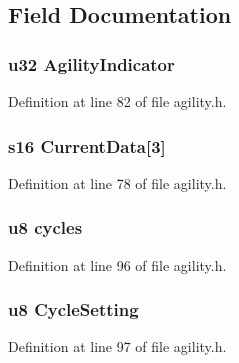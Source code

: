 \subsection{\-Field \-Documentation}
\hypertarget{structagil_aca4918ae56fe21d73cc4b85d5ce1d3af}{
\subsubsection[{\-Agility\-Indicator}]{\setlength{\rightskip}{0pt plus 5cm}u32 {\bf \-Agility\-Indicator}}}\label{structagil_aca4918ae56fe21d73cc4b85d5ce1d3af}


\-Definition at line 82 of file agility.\-h.

\hypertarget{structagil_ac11c5137c1e21f67a03b39f8d0325bc1}{
\subsubsection[{\-Current\-Data}]{\setlength{\rightskip}{0pt plus 5cm}s16 {\bf \-Current\-Data}\mbox{[}3\mbox{]}}}\label{structagil_ac11c5137c1e21f67a03b39f8d0325bc1}


\-Definition at line 78 of file agility.\-h.

\hypertarget{structagil_a9fb4c5ef5c7048e3974f3fa10ed4595c}{
\subsubsection[{cycles}]{\setlength{\rightskip}{0pt plus 5cm}u8 {\bf cycles}}}\label{structagil_a9fb4c5ef5c7048e3974f3fa10ed4595c}


\-Definition at line 96 of file agility.\-h.

\hypertarget{structagil_a215f5f3e0ef8079a4197952e909fe0e7}{
\subsubsection[{\-Cycle\-Setting}]{\setlength{\rightskip}{0pt plus 5cm}u8 {\bf \-Cycle\-Setting}}}\label{structagil_a215f5f3e0ef8079a4197952e909fe0e7}


\-Definition at line 97 of file agility.\-h.

